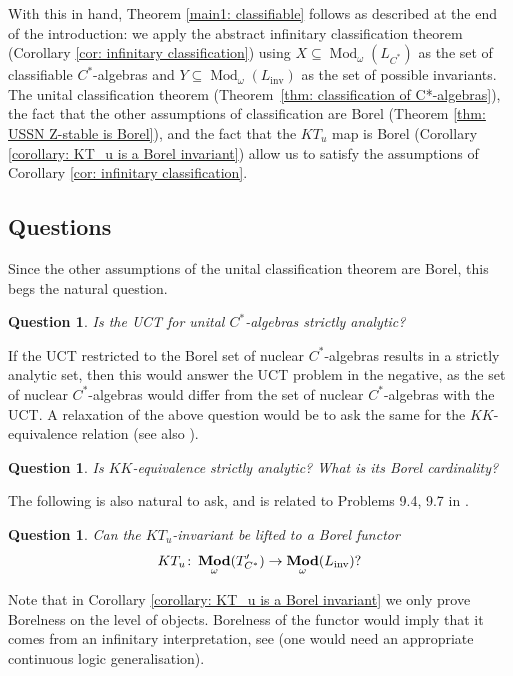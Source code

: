 \documentclass[12pt]{amsart}
\newtheorem{question}[theorem]{Question}
\DeclareMathOperator{\Mod}{Mod}
\DeclareMathOperator{\bfMod}{\bf{Mod}}
\DeclareMathOperator{\inv}{inv}
\newcommand{\Lang}{L}
\begin{document}
With this in hand, Theorem \ref{main1: classifiable} follows as described at the end of the introduction: we apply the abstract infinitary classification theorem (Corollary \ref{cor: infinitary classification}) using $X \subseteq \Mod_{\omega}(L_{C^*})$ as the set of classifiable $C^*$-algebras and $Y \subseteq \Mod_{\omega}(L_{\inv})$ as the set of possible invariants. 
The unital classification theorem (Theorem~\ref{thm: classification of C*-algebras}), the fact that the other assumptions of classification are Borel (Theorem \ref{thm: USSN Z-stable is Borel}), and the fact that the $KT_u$ map is Borel (Corollary \ref{corollary: KT_u is a Borel invariant}) allow us to satisfy the assumptions of Corollary \ref{cor: infinitary classification}.

\subsection{Questions}
Since the other assumptions of the unital classification theorem are Borel, this begs the natural question.
\begin{question}
    Is the UCT for unital $C^*$-algebras strictly analytic?
\end{question}

If the UCT restricted to the Borel set of nuclear $C^*$-algebras results in a  strictly analytic set, then this would answer the UCT problem in the negative, as the set of nuclear $C^*$-algebras would differ from the set of nuclear $C^*$-algebras with the UCT.
A relaxation of the above question would be to ask the same for the $KK$-equivalence relation (see also \cite[Problem 9.3]{Farahturbulence2014}).
\begin{question}
    Is $KK$-equivalence strictly analytic? What is its Borel cardinality?
\end{question}
The following is also natural to ask, and is related to Problems 9.4, 9.7 in \cite{Farahturbulence2014}.
\begin{question}
    Can the $KT_u$-invariant be lifted to a Borel functor \[ KT_u \colon \bfMod_{\omega}(T_{C^*}') \to \bfMod_{\omega}(\Lang_{\inv})?\]
\end{question}
Note that in Corollary \ref{corollary: KT_u is a Borel invariant} we only prove Borelness on the level of objects. Borelness of the functor would imply that it comes from an infinitary interpretation, see \cite{MR3893282, MR4029718} (one would need an appropriate continuous logic generalisation). 

\printbibliography 
\end{document}
